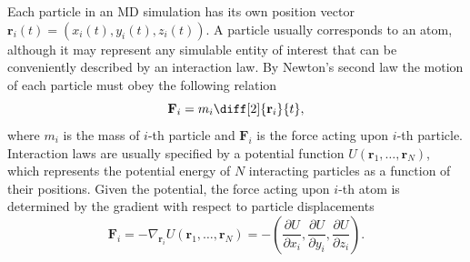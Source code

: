 Each particle in an MD simulation has its own position vector
$\mathbf{r}_i(t) = (x_i(t), y_i(t), z_i(t))$. A particle usually corresponds
to an atom, although it may represent any simulable entity of interest that
can be conveniently described by an interaction law. By Newton's second law
the motion of each particle must obey the following relation
\begin{equation}
  \mathbf{F}_i = m_i \diff[2]{\mathbf{r}_i}{t},
\end{equation}
where $m_i$ is the mass of $i$-th particle and $\mathbf{F}_i$ is the
force acting upon $i$-th particle. Interaction laws are usually specified by
a potential function $U(\mathbf{r}_1, \dots, \mathbf{r}_N)$, which represents
the potential energy of $N$ interacting particles as a function of their
positions. Given the potential, the force acting upon $i$-th atom is
determined by the gradient with respect to particle displacements
\begin{equation}
  \mathbf{F}_i = - \nabla_{\mathbf{r}_i} U(\mathbf{r}_1, \dots, \mathbf{r}_N)
  = - \left(
    \frac{\partial U}{\partial x_i},
    \frac{\partial U}{\partial y_i},
    \frac{\partial U}{\partial z_i}
  \right).
\end{equation}

